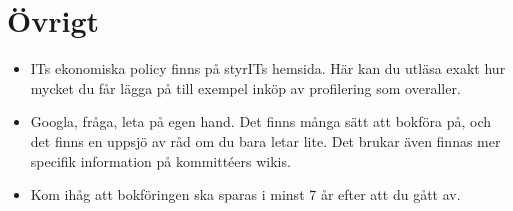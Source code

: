 \documentclass{article}
\begin{document}
\section{Övrigt}
\begin{itemize}
    \item ITs ekonomiska policy finns på styrITs hemsida. Här kan du utläsa exakt hur mycket du får lägga på till exempel inköp av profilering som overaller.
    \item Googla, fråga, leta på egen hand. Det finns många sätt att bokföra på, och det finns en
uppsjö av råd om du bara letar lite. Det brukar även finnas mer specifik information på
kommittéers wikis.
    \item Kom ihåg att bokföringen ska sparas i minst 7 år efter att du gått av.
\end{itemize}
\end{document}
